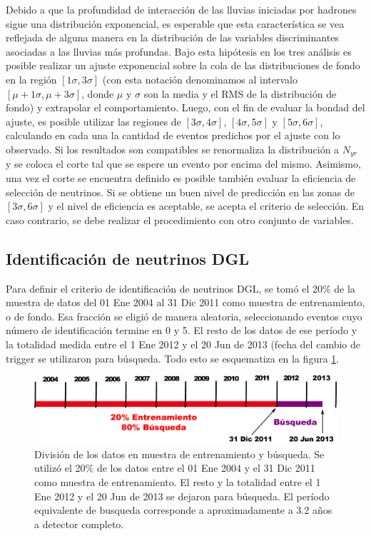 	Debido a que la profundidad de interacción de las lluvias iniciadas por hadrones sigue una distribución exponencial, es esperable que esta característica se vea reflejada de alguna manera en la distribución de las variables discriminantes asociadas a las lluvias más profundas.
	Bajo esta hipótesis en los tres análisis es posible realizar un ajuste exponencial sobre la cola de las distribuciones de fondo en la región $[1\sigma, 3\sigma]$ (con esta notación denominamos al intervalo $[\mu+1\sigma, \mu+3\sigma]$, donde $\mu$ y $\sigma$ son la media y el RMS de la distribución de fondo) y extrapolar el comportamiento.
	Luego, con el fin de evaluar la bondad del ajuste, es posible utilizar las regiones de $[3\sigma, 4\sigma]$, $[4\sigma, 5\sigma]$ y $[5\sigma, 6\sigma]$, calculando en cada una la cantidad de eventos predichos por el ajuste con lo observado.
	Si los resultados son compatibles se renormaliza la distribución a $N_{yr}$ y se coloca el corte tal que se espere un evento por encima del mismo.
	Asimismo, una vez el corte se encuentra definido es posible también evaluar la eficiencia de selección de neutrinos.
	Si se obtiene un buen nivel de predicción en las zonas de $[3\sigma, 6\sigma]$ y el nivel de eficiencia es aceptable, se acepta el criterio de selección.
	En caso contrario, se debe realizar el procedimiento con otro conjunto de variables.
	
	\subsection{Identificación de neutrinos DGL}
	
	Para definir el criterio de identificación de neutrinos DGL, se tomó el 20$\%$ de la muestra de datos del 01 Ene 2004 al 31 Dic 2011 como muestra de entrenamiento, o de fondo.
	Esa fracción se eligió de manera aleatoria, seleccionando eventos cuyo número de identificación termine en 0 y 5.
	El resto de los datos de ese período y la totalidad medida entre el 1 Ene 2012 y el 20 Jun de 2013 (fecha del cambio de trigger 
	se utilizaron para búsqueda.
	Todo esto se esquematiza en la figura \ref{fig:periodosDGL}.
	\begin{figure}[ht]
	\begin{center}
	\includegraphics[width=\textwidth]{fig/seleccionAuger/periodosDGL}
	\caption{División de los datos en muestra de entrenamiento y búsqueda. Se utilizó el 20$\%$ de los datos entre el 01 Ene 2004 y el 31 Dic 2011 como muestra de entrenamiento. El resto y la totalidad entre el 1 Ene 2012 y el 20 Jun de 2013 se dejaron para búsqueda. El período equivalente de busqueda corresponde a aproximadamente a 3.2 años a detector completo.}
	\label{fig:periodosDGL}
	\end{center}
	\end{figure}
	
